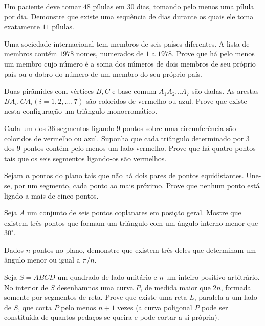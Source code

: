 \begin{questao}
  Um paciente deve tomar $48$ pílulas em $30$ dias,
  tomando pelo menos uma pílula por dia. Demonstre que existe uma
  sequência de dias durante os quais ele toma exatamente $11$
  pílulas.
\end{questao}

\begin{questao}
  Uma sociedade internacional tem membros de seis países
  diferentes. A lista de membros contém $1978$ nomes, numerados de
  $1$ a $1978$. Prove que há pelo menos um membro cujo número é a
  soma dos números de dois membros de seu próprio país ou o dobro do
  número de um membro do seu próprio país.
\end{questao}

\begin{questao}
  Duas pirâmides com vértices $B,C$ e base comum $A_1 A_2
  \ldots A_7$ são dadas. As arestas $BA_i,CA_i (i=1,2,\ldots,7)$ são
  coloridos de vermelho ou azul. Prove que existe nesta configuração
  um triângulo monocromático.
\end{questao}

\begin{questao}
  Cada um dos $36$ segmentos ligando $9$ pontos sobre
  uma circunferência são coloridos de vermelho ou azul. Suponha que
  cada triângulo determinado por $3$ dos $9$ pontos contém pelo
  menos um lado vermelho. Prove que há quatro pontos tais que os seis
  segmentos ligando-os são vermelhos.
\end{questao}

\begin{questao}
  Sejam $n$ pontos do plano tais que não há dois pares de
  pontos equidistantes. Une-se, por um segmento, cada ponto ao mais
  próximo. Prove que nenhum ponto está ligado a mais de cinco pontos.
\end{questao}

\begin{questao}
  Seja $A$ um conjunto de seis pontos coplanares em posição
  geral. Mostre que existem três pontos que formam um triângulo com um
  ângulo interno menor que $30^\circ$.
\end{questao}

\begin{questao}
  Dados $n$ pontos no plano, demonstre que existem três
  deles que determinam um ângulo menor ou igual a $\pi/n$.
\end{questao}

\begin{questao}
  Seja $S=ABCD$ um quadrado de lado unitário e $n$ um
  inteiro positivo arbitrário. No interior de $S$ desenhamnos uma
  curva $P$, de medida maior que $2n$, formada somente por segmentos
  de reta. Prove que existe uma reta $L$, paralela a um lado de $S$,
  que corta $P$ pelo menos $n+1$ vezes (a curva poligonal $P$ pode
  ser constituída de quantos pedaços se queira e pode cortar a si
  própria).
\end{questao}


